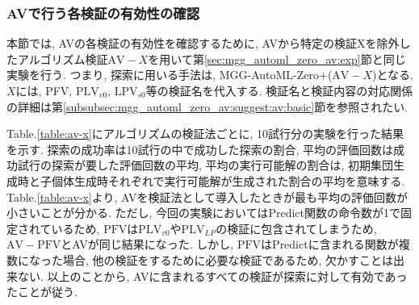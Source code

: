 \documentclass[11pt,oneside,openany,report]{jsbook}
\begin{document}
\subsubsection{AVで行う各検証の有効性の確認}\label{subsubsec:mgg_automl_zero_av:consideration:av:each_analysis}

本節では, AVの各検証の有効性を確認するために, AVから特定の検証Xを除外したアルゴリズム検証$\mathrm{AV}-X$を用いて第\ref{sec:mgg_automl_zero_av:exp}節と同じ実験を行う. つまり, 探索に用いる手法は, MGG-AutoML-Zero+($\mathrm{AV}-X$)となる. $X$には, PFV, $\mathrm{PLV}_{v0}$, $\mathrm{LPV}_{s0}$等の検証名を代入する. 検証名と検証内容の対応関係の詳細は第\ref{subsubsec:mgg_automl_zero_av:suggest:av:basic}節を参照されたい.

Table.\ref{table:av-x}にアルゴリズムの検証法ごとに, 10試行分の実験を行った結果を示す. 探索の成功率は10試行の中で成功した探索の割合, 平均の評価回数は成功試行の探索が要した評価回数の平均, 平均の実行可能解の割合は, 初期集団生成時と子個体生成時それぞれで実行可能解が生成された割合の平均を意味する. Table.\ref{table:av-x}より, AVを検証法として導入したときが最も平均の評価回数が小さいことが分かる. ただし, 今回の実験においてはPredict関数の命令数が1で固定されているため, $\mathrm{PFV}$は$\mathrm{PLV}_{v0}$や$\mathrm{PLV}_{LP}$の検証に包含されてしまうため, $\mathrm{AV}-\mathrm{PFV}$とAVが同じ結果になった. しかし, $\mathrm{PFV}$はPredictに含まれる関数が複数になった場合, 他の検証をするために必要な検証であるため, 欠かすことは出来ない. 以上のことから, AVに含まれるすべての検証が探索に対して有効であったことが従う.
\end{document}
